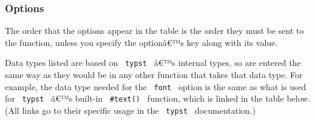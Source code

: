 \subsubsection{Options}\label{options}

The order that the options appear in the table is the order they must be
sent to the function, unless you specify the optionâ€™s key along with
its value.

Data types listed are based on \texttt{\ typst\ } â€™s internal types,
so are entered the same way as they would be in any other function that
takes that data type. For example, the data type needed for the
\texttt{\ font\ } option is the same as what is used for
\texttt{\ typst\ } â€™s built-in \texttt{\ \#text()\ } function, which
is linked in the table below. (All links go to their specific usage in
the \texttt{\ typst\ } documentation.)

